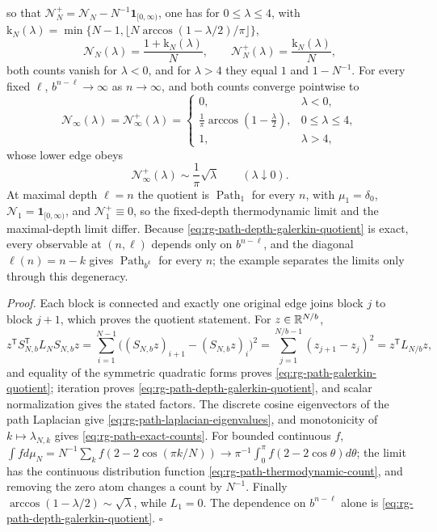 so that \(\mathcal N^+_N=\mathcal N_N-N^{-1}\mathbf1_{[0,\infty)}\), one has for
\(0\leq\lambda\leq4\), with
\(\mathrm k_N(\lambda)=\min\{N-1,\lfloor N\arccos(1-\lambda/2)/\pi\rfloor\}\),
\begin{equation}
\mathcal N_N(\lambda)=\frac{1+\mathrm k_N(\lambda)}{N},
\qquad
\mathcal N^+_N(\lambda)=\frac{\mathrm k_N(\lambda)}{N},
\label{eq:rg-path-exact-counts}
\end{equation}
both counts vanish for \(\lambda<0\), and for \(\lambda>4\) they equal \(1\) and
\(1-N^{-1}\). For every fixed \(\ell\), \(b^{n-\ell}\to\infty\) as
\(n\to\infty\), and both counts converge pointwise to
\begin{equation}
\mathcal N_\infty(\lambda)=\mathcal N^+_\infty(\lambda)
=
\begin{cases}
0,&\lambda<0,\\[2pt]
\displaystyle\frac1\pi\arccos\left(1-\frac{\lambda}{2}\right),
&0\leq\lambda\leq4,\\[7pt]
1,&\lambda>4,
\end{cases}
\label{eq:rg-path-thermodynamic-count}
\end{equation}
whose lower edge obeys
\begin{equation}
\mathcal N^+_\infty(\lambda)\sim\frac1\pi\sqrt{\lambda}
\qquad(\lambda\downarrow0).
\label{eq:rg-path-lower-edge-count}
\end{equation}
At maximal depth \(\ell=n\) the quotient is \(\operatorname{Path}_1\) for every
\(n\), with \(\mu_1=\delta_0\), \(\mathcal N_1=\mathbf1_{[0,\infty)}\), and
\(\mathcal N^+_1\equiv0\), so the fixed-depth thermodynamic limit and the
maximal-depth limit differ. Because \eqref{eq:rg-path-depth-galerkin-quotient}
is exact, every observable at \((n,\ell)\) depends only on \(b^{n-\ell}\), and
the diagonal \(\ell(n)=n-k\) gives \(\operatorname{Path}_{b^k}\) for every
\(n\); the example separates the limits only through this degeneracy.

\noindent\emph{Proof.}
Each block is connected and exactly one original edge joins block \(j\) to
block \(j+1\), which proves the quotient statement. For \(z\in\mathbb R^{N/b}\),
\[
z^{\mathsf T}S_{N,b}^{\mathsf T}L_NS_{N,b}z
=\sum_{i=1}^{N-1}\bigl((S_{N,b}z)_{i+1}-(S_{N,b}z)_i\bigr)^2
=\sum_{j=1}^{N/b-1}(z_{j+1}-z_j)^2
=z^{\mathsf T}L_{N/b}z,
\]
and equality of the symmetric quadratic forms proves
\eqref{eq:rg-path-galerkin-quotient}; iteration proves
\eqref{eq:rg-path-depth-galerkin-quotient}, and scalar normalization gives the
stated factors. The discrete cosine eigenvectors of the path Laplacian give
\eqref{eq:rg-path-laplacian-eigenvalues}, and monotonicity of
\(k\mapsto\lambda_{N,k}\) gives \eqref{eq:rg-path-exact-counts}. For bounded
continuous \(f\),
\(\int fd\mu_N=N^{-1}\sum_kf(2-2\cos(\pi k/N))\to
\pi^{-1}\int_0^\pi f(2-2\cos\theta)d\theta\); the limit has the continuous
distribution function \eqref{eq:rg-path-thermodynamic-count}, and removing
the zero atom changes a count by \(N^{-1}\). Finally
\(\arccos(1-\lambda/2)\sim\sqrt\lambda\), while \(L_1=0\). The dependence on
\(b^{n-\ell}\) alone is \eqref{eq:rg-path-depth-galerkin-quotient}. \(\square\)

